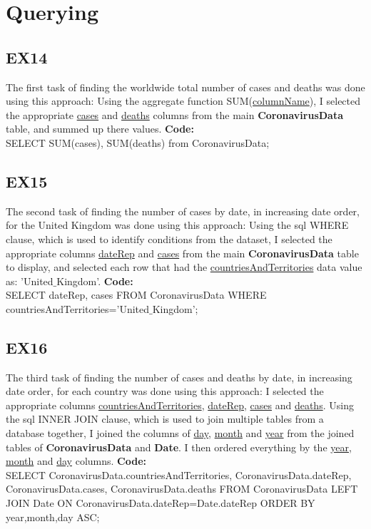 \documentclass[10pt]{article}
\begin{document}
\section{Querying}
\subsection{EX14}
The first task of finding the worldwide total number of cases and deaths was done using this approach:
Using the aggregate function SUM(\underline{columnName}), I selected the appropriate \underline{cases} and \underline{deaths} columns from the main \textbf{CoronavirusData} table, and summed up there values.  \textbf{Code:} \\
SELECT SUM(cases), SUM(deaths) from CoronavirusData;

\subsection{EX15}
The second task of finding the number of cases by date, in increasing date order, for the United Kingdom was done using this approach:
Using the sql WHERE clause, which is used to identify conditions from the dataset, I selected the appropriate columns \underline{dateRep} and \underline{cases}  from the main \textbf{CoronavirusData} table to display, and selected each row that had the \underline{countriesAndTerritories} data value as: 'United$\_$Kingdom'.  \textbf{Code:} \\
SELECT dateRep, cases FROM CoronavirusData WHERE countriesAndTerritories='United$\_$Kingdom';

\subsection{EX16}
The third task of finding the number of cases and deaths by date, in increasing date order, for each country was done using this approach:
I selected the appropriate columns \underline{countriesAndTerritories}, \underline{dateRep}, \underline{cases} and \underline{deaths}. Using the sql INNER JOIN clause, which is used to join multiple tables from a database together, I joined the columns of \underline{day}, \underline{month} and \underline{year} from the joined tables of \textbf{CoronavirusData} and \textbf{Date}. I then ordered everything by the \underline{year}, \underline{month} and \underline{day} columns.  \textbf{Code:} \\
SELECT CoronavirusData.countriesAndTerritories, CoronavirusData.dateRep, CoronavirusData.cases, CoronavirusData.deaths
FROM CoronavirusData
	LEFT JOIN Date ON CoronavirusData.dateRep=Date.dateRep
ORDER BY year,month,day ASC;
\end{document}

